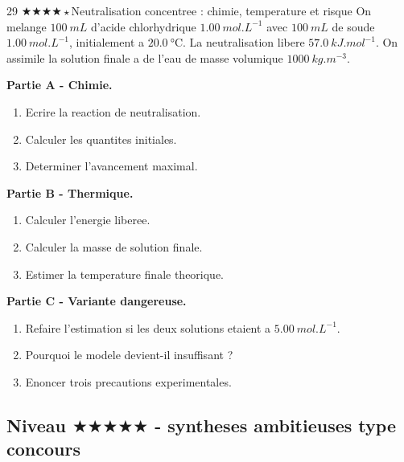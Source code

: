 \documentclass[11pt,a4paper]{article}
\newcommand{\difffour}{\(\bigstar\bigstar\bigstar\bigstar\star\)}
\newcommand{\difffive}{\(\bigstar\bigstar\bigstar\bigstar\bigstar\)}
\begin{document}
\begin{probleme}{29 \difffour}{Neutralisation concentree : chimie, temperature et risque}
On melange \(\SI{100}{mL}\) d'acide chlorhydrique \(\SI{1.00}{mol.L^{-1}}\) avec \(\SI{100}{mL}\) de soude \(\SI{1.00}{mol.L^{-1}}\), initialement a \(\SI{20.0}{\celsius}\). La neutralisation libere \(\SI{57.0}{kJ.mol^{-1}}\). On assimile la solution finale a de l'eau de masse volumique \(\SI{1000}{kg.m^{-3}}\).

\textbf{Partie A - Chimie.}
\begin{enumerate}
\item Ecrire la reaction de neutralisation.
\item Calculer les quantites initiales.
\item Determiner l'avancement maximal.
\end{enumerate}

\textbf{Partie B - Thermique.}
\begin{enumerate}[resume]
\item Calculer l'energie liberee.
\item Calculer la masse de solution finale.
\item Estimer la temperature finale theorique.
\end{enumerate}

\textbf{Partie C - Variante dangereuse.}
\begin{enumerate}[resume]
\item Refaire l'estimation si les deux solutions etaient a \(\SI{5.00}{mol.L^{-1}}\).
\item Pourquoi le modele devient-il insuffisant ?
\item Enoncer trois precautions experimentales.
\end{enumerate}
\end{probleme}

\subsection{Niveau \difffive{} - syntheses ambitieuses type concours}
\end{document}
